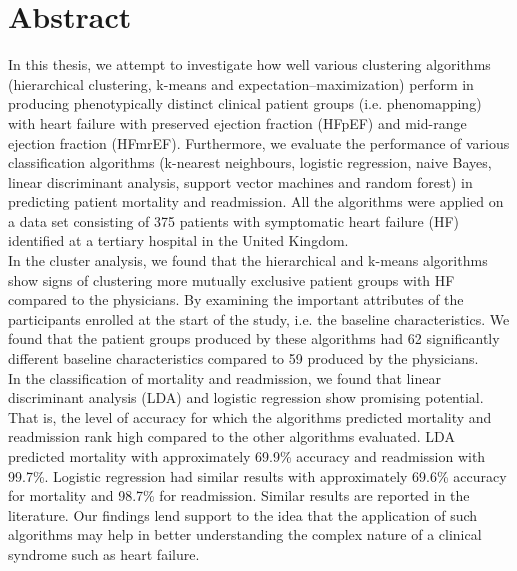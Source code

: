 \documentclass[../thesis.tex]{subfiles}
\begin{document}
\chapter*{Abstract}

\noindent In this thesis, we attempt to investigate how well various clustering algorithms (hierarchical clustering, k-means and expectation–maximization) perform in producing phenotypically distinct clinical patient groups (i.e. phenomapping) with heart failure with preserved ejection fraction (HFpEF) and mid-range ejection fraction (HFmrEF). Furthermore, we evaluate the performance of various classification algorithms (k-nearest neighbours, logistic regression, naive Bayes, linear discriminant analysis, support vector machines and random forest) in predicting patient mortality and readmission. All the algorithms were applied on a data set consisting of 375 patients with symptomatic heart failure (HF) identified at a tertiary hospital in the United Kingdom.\\
\indent In the cluster analysis, we found that the hierarchical and k-means algorithms show signs of clustering more mutually exclusive patient groups with HF compared to the physicians. By examining the important attributes of the participants enrolled at the start of the study, i.e. the baseline characteristics. We found that the patient groups produced by these algorithms had 62 significantly different baseline characteristics compared to 59 produced by the physicians. \\
\indent In the classification of mortality and readmission, we found that linear discriminant analysis (LDA) and logistic regression show promising potential. That is, the level of accuracy for which the algorithms predicted mortality and readmission rank high compared to the other algorithms evaluated. LDA predicted mortality with approximately 69.9\% accuracy and readmission with 99.7\%. Logistic regression had similar results with approximately 69.6\% accuracy for mortality and 98.7\% for readmission. Similar results are reported in the literature. Our findings lend support to the idea that the application of such algorithms may help in better understanding the complex nature of a clinical syndrome such as heart failure.
\end{document}
